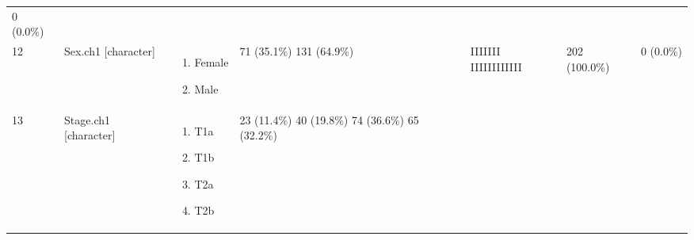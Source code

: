 \documentclass[
]{article}
\providecommand{\tightlist}{%
  \setlength{\itemsep}{0pt}\setlength{\parskip}{0pt}}
\begin{document}
\begin{longtable}[]{@{}lllllll@{}}
\begin{minipage}[t]{0.07\columnwidth}
0
(0.0\%)\strut
\end{minipage}\tabularnewline
\begin{minipage}[t]{0.03\columnwidth}\raggedright
12\strut
\end{minipage} & \begin{minipage}[t]{0.16\columnwidth}\raggedright
Sex.ch1
{[}character{]}\strut
\end{minipage} & \begin{minipage}[t]{0.20\columnwidth}\raggedright
\begin{enumerate}
\def\labelenumi{\arabic{enumi}.}
\tightlist
\item
  Female
\item
  Male
\end{enumerate}\strut
\end{minipage} & \begin{minipage}[t]{0.14\columnwidth}\raggedright
71 (35.1\%)
131 (64.9\%)\strut
\end{minipage} & \begin{minipage}[t]{0.14\columnwidth}\raggedright
IIIIIII
IIIIIIIIIIII\strut
\end{minipage} & \begin{minipage}[t]{0.07\columnwidth}\raggedright
202
(100.0\%)\strut
\end{minipage} & \begin{minipage}[t]{0.07\columnwidth}\raggedright
0
(0.0\%)\strut
\end{minipage}\tabularnewline
\begin{minipage}[t]{0.03\columnwidth}\raggedright
13\strut
\end{minipage} & \begin{minipage}[t]{0.16\columnwidth}\raggedright
Stage.ch1
{[}character{]}\strut
\end{minipage} & \begin{minipage}[t]{0.20\columnwidth}\raggedright
\begin{enumerate}
\def\labelenumi{\arabic{enumi}.}
\tightlist
\item
  T1a
\item
  T1b
\item
  T2a
\item
  T2b
\end{enumerate}\strut
\end{minipage} & \begin{minipage}[t]{0.14\columnwidth}\raggedright
23 (11.4\%)
40 (19.8\%)
74 (36.6\%)
65 (32.2\%)\strut
\end{minipage} & \begin{minipage}[t]{0.14\columnwidth}\raggedright

\end{minipage}
\end{longtable}
\end{document}
